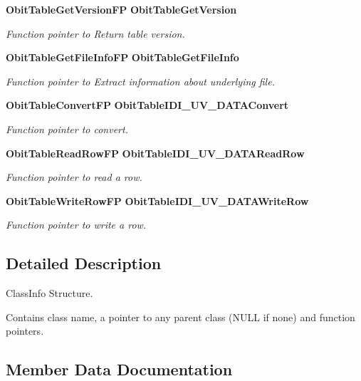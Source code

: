 \begin{CompactItemize}
{\bf Obit\-Table\-Get\-Version\-FP} {\bf Obit\-Table\-Get\-Version}
\begin{CompactList}\small\item\em Function pointer to Return table version. \item\end{CompactList}\item 
{\bf Obit\-Table\-Get\-File\-Info\-FP} {\bf Obit\-Table\-Get\-File\-Info}
\begin{CompactList}\small\item\em Function pointer to Extract information about underlying file. \item\end{CompactList}\item 
{\bf Obit\-Table\-Convert\-FP} {\bf Obit\-Table\-IDI\_\-UV\_\-DATAConvert}
\begin{CompactList}\small\item\em Function pointer to convert. \item\end{CompactList}\item 
{\bf Obit\-Table\-Read\-Row\-FP} {\bf Obit\-Table\-IDI\_\-UV\_\-DATARead\-Row}
\begin{CompactList}\small\item\em Function pointer to read a row. \item\end{CompactList}\item 
{\bf Obit\-Table\-Write\-Row\-FP} {\bf Obit\-Table\-IDI\_\-UV\_\-DATAWrite\-Row}
\begin{CompactList}\small\item\em Function pointer to write a row. \item\end{CompactList}\end{CompactItemize}


\subsection{Detailed Description}
Class\-Info Structure. 

Contains class name, a pointer to any parent class (NULL if none) and function pointers. 



\subsection{Member Data Documentation}
